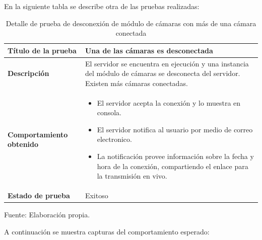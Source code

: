 En la siguiente tabla se describe otra de las pruebas realizadas:\\

\begin{table}[H]
    \caption{Detalle de prueba de desconexión de módulo de cámaras con más de una cámara conectada}
    \begin{center}
        \begin{tabular}{|>{\centering}p{}|m{}<{\centering}|} 
            \hline
            \textbf{Título de la prueba} & Una de las cámaras es desconectada \\
            \hline
            \textbf{Descripción} & El servidor se encuentra en ejecución y una instancia del módulo de cámaras se desconecta del servidor. Existen más cámaras conectadas.\\
            \hline
            \textbf{Comportamiento obtenido} & 
            \begin{itemize}
                \item El servidor acepta la conexión y lo muestra en consola.
                \item El servidor notifica al usuario por medio de correo electronico.
                \item La notificación provee información sobre la fecha y hora de la conexión, compartiendo el enlace para la transmisión en vivo.
            \end{itemize} \\ 
            \hline
            \textbf{Estado de prueba} & Exitoso \\
            \hline
        \end{tabular}
    \end{center}
    \begin{center}
        Fuente: Elaboración propia.
    \end{center}    
\end{table}

A continuación se muestra capturas del comportamiento esperado:

